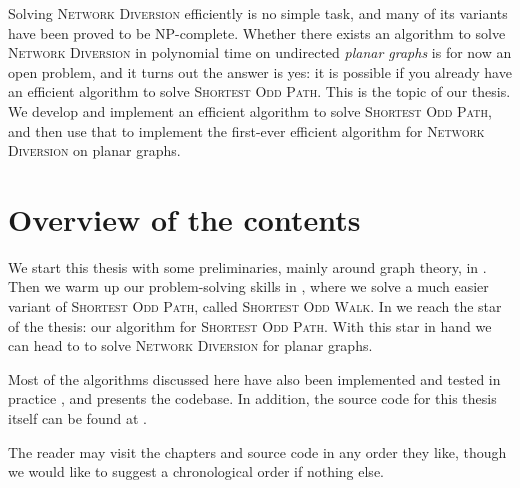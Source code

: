 Solving \textsc{Network Diversion} efficiently is no simple task, and many of its variants have been proved to be NP-complete. Whether there exists an algorithm to solve \textsc{Network Diversion} in polynomial time on undirected \emph{planar graphs} is for now an open problem, and it turns out the answer is yes: it is possible if you already have an efficient algorithm to solve \textsc{Shortest Odd Path}. This is the topic of our thesis. We develop and implement an efficient algorithm to solve \textsc{Shortest Odd Path}, and then use that to implement the first-ever efficient algorithm for \textsc{Network Diversion} on planar graphs.

\section*{Overview of the contents}
We start this thesis with some preliminaries, mainly around graph theory, in . Then we warm up our problem-solving skills in , where we solve a much easier variant of \textsc{Shortest Odd Path}, called \textsc{Shortest Odd Walk}. In  we reach the star of the thesis: our algorithm for \textsc{Shortest Odd Path}. With this star in hand we can head to  to solve \textsc{Network Diversion} for planar graphs. 

Most of the algorithms discussed here have also been implemented and tested in practice \cite{source:codebase}, and  presents the codebase. In addition, the source code for this thesis itself can be found at \cite{source:thesis}.

The reader may visit the chapters and source code in any order they like, though we would like to suggest a chronological order if nothing else.
